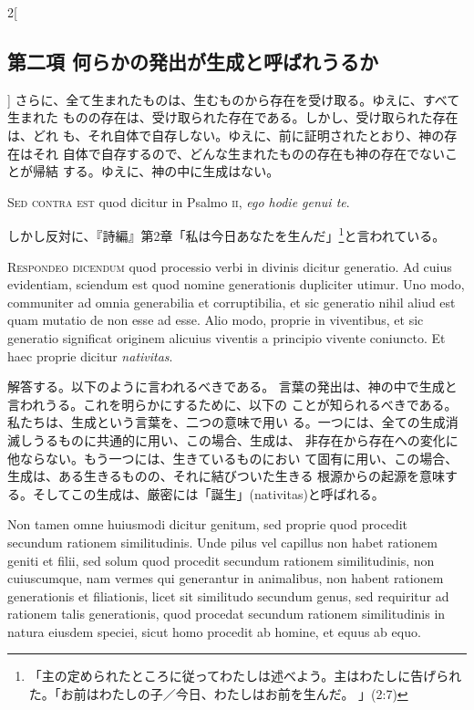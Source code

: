 \documentclass[paper=a4paper,fontsize=10pt,jafontsize=9pt,titlepage]{jlreq}
\begin{document}
\begin{paracol}{2}[\subsection{第二項 何らかの発出が生成と呼ばれうるか}]
さらに、全て生まれたものは、生むものから存在を受け取る。ゆえに、すべて生まれた
 ものの存在は、受け取られた存在である。しかし、受け取られた存在は、どれ
 も、それ自体で自存しない。ゆえに、前に証明されたとおり、神の存在はそれ
 自体で自存するので、どんな生まれたものの存在も神の存在でないことが帰結
 する。ゆえに、神の中に生成はない。


\switchcolumn*[\subsection{s.c.}]


{\scshape Sed contra est} quod dicitur in Psalmo {\scshape ii}, {\itshape ego hodie genui te}.


\switchcolumn


しかし反対に、『詩編』第2章「私は今日あなたを生んだ」\footnote{「主の定められたところに従ってわたしは述べよう。主はわたしに告げられた。「お前はわたしの子／今日、わたしはお前を生んだ。 」(2:7)}と言われている。




{\scshape Respondeo dicendum} quod processio verbi in divinis dicitur generatio. Ad
cuius evidentiam, sciendum est quod nomine generationis dupliciter
utimur. Uno modo, communiter ad omnia generabilia et corruptibilia, et
sic generatio nihil aliud est quam mutatio de non esse ad esse. Alio
modo, proprie in viventibus, et sic generatio significat originem
alicuius viventis a principio vivente coniuncto. Et haec proprie dicitur
{\itshape nativitas}.


\switchcolumn


解答する。以下のように言われるべきである。
言葉の発出は、神の中で生成と言われうる。これを明らかにするために、以下の
 ことが知られるべきである。私たちは、生成という言葉を、二つの意味で用い
 る。一つには、全ての生成消滅しうるものに共通的に用い、この場合、生成は、
 非存在から存在への変化に他ならない。もう一つには、生きているものにおい
 て固有に用い、この場合、生成は、ある生きるものの、それに結びついた生きる
 根源からの起源を意味する。そしてこの生成は、厳密には「誕生」(nativitas)と呼ばれる。


\switchcolumn*


Non tamen omne huiusmodi dicitur genitum, sed proprie quod
procedit secundum rationem similitudinis. Unde pilus vel capillus non
habet rationem geniti et filii, sed solum quod procedit secundum
rationem similitudinis, non cuiuscumque, nam vermes qui generantur in
animalibus, non habent rationem generationis et filiationis, licet sit
similitudo secundum genus, sed requiritur ad rationem talis
generationis, quod procedat secundum rationem similitudinis in natura
eiusdem speciei, sicut homo procedit ab homine, et equus ab equo.



\end{paracol}
\end{document}

